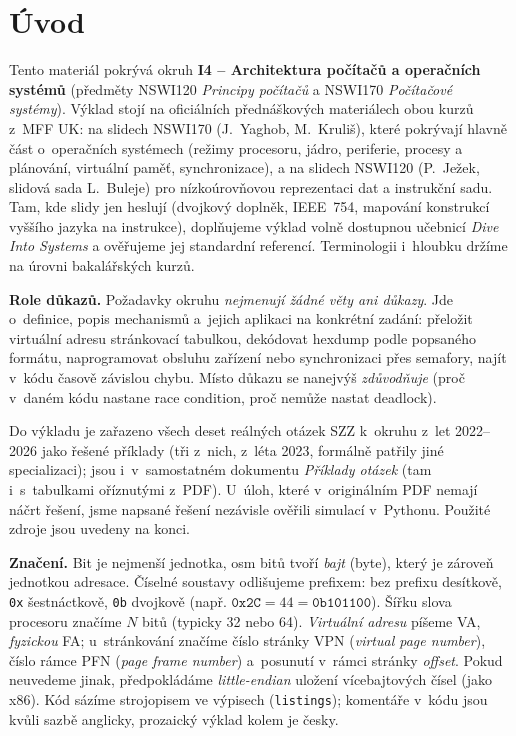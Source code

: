 \documentclass[11pt,a4paper]{article}
\begin{document}
\maketitle
\tableofcontents
\bigskip

\section*{Úvod}

Tento materiál pokrývá okruh \textbf{I4 -- Architektura počítačů a operačních systémů} (předměty NSWI120 \emph{Principy počítačů} a NSWI170 \emph{Počítačové systémy}). Výklad stojí na oficiálních přednáškových materiálech obou kurzů z~MFF UK: na slidech NSWI170 (J.~Yaghob, M.~Kruliš), které pokrývají hlavně část o~operačních systémech (režimy procesoru, jádro, periferie, procesy a plánování, virtuální paměť, synchronizace), a na slidech NSWI120 (P.~Ježek, slidová sada L.~Buleje) pro nízkoúrovňovou reprezentaci dat a instrukční sadu. Tam, kde slidy jen heslují (dvojkový doplněk, IEEE~754, mapování konstrukcí vyššího jazyka na instrukce), doplňujeme výklad volně dostupnou učebnicí \emph{Dive Into Systems} a ověřujeme jej standardní referencí. Terminologii i~hloubku držíme na úrovni bakalářských kurzů.

\noindent\textbf{Role důkazů.} Požadavky okruhu \emph{nejmenují žádné věty ani důkazy}. Jde o~definice, popis mechanismů a~jejich aplikaci na konkrétní zadání: přeložit virtuální adresu stránkovací tabulkou, dekódovat hexdump podle popsaného formátu, naprogramovat obsluhu zařízení nebo synchronizaci přes semafory, najít v~kódu časově závislou chybu. Místo důkazu se nanejvýš \emph{zdůvodňuje} (proč v~daném kódu nastane race condition, proč nemůže nastat deadlock).

Do výkladu je zařazeno všech deset reálných otázek SZZ k~okruhu z~let 2022--2026 jako řešené příklady (tři z~nich, z~léta 2023, formálně patřily jiné specializaci); jsou i~v~samostatném dokumentu \emph{Příklady otázek} (tam i~s~tabulkami oříznutými z~PDF). U~úloh, které v~originálním PDF nemají náčrt řešení, jsme napsané řešení nezávisle ověřili simulací v~Pythonu. Použité zdroje jsou uvedeny na konci.

\medskip
\noindent\textbf{Značení.} Bit je nejmenší jednotka, osm bitů tvoří \emph{bajt} (byte), který je zároveň jednotkou adresace. Číselné soustavy odlišujeme prefixem: bez prefixu desítkově, \texttt{0x} šestnáctkově, \texttt{0b} dvojkově (např. $\texttt{0x2C}=44=\texttt{0b101100}$). Šířku slova procesoru značíme $N$ bitů (typicky 32 nebo 64). \emph{Virtuální adresu} píšeme VA, \emph{fyzickou} FA; u~stránkování značíme číslo stránky VPN (\emph{virtual page number}), číslo rámce PFN (\emph{page frame number}) a~posunutí v~rámci stránky \emph{offset}. Pokud neuvedeme jinak, předpokládáme \emph{little-endian} uložení vícebajtových čísel (jako x86). Kód sázíme strojopisem ve výpisech (\texttt{listings}); komentáře v~kódu jsou kvůli sazbě anglicky, prozaický výklad kolem je česky.
\end{document}

